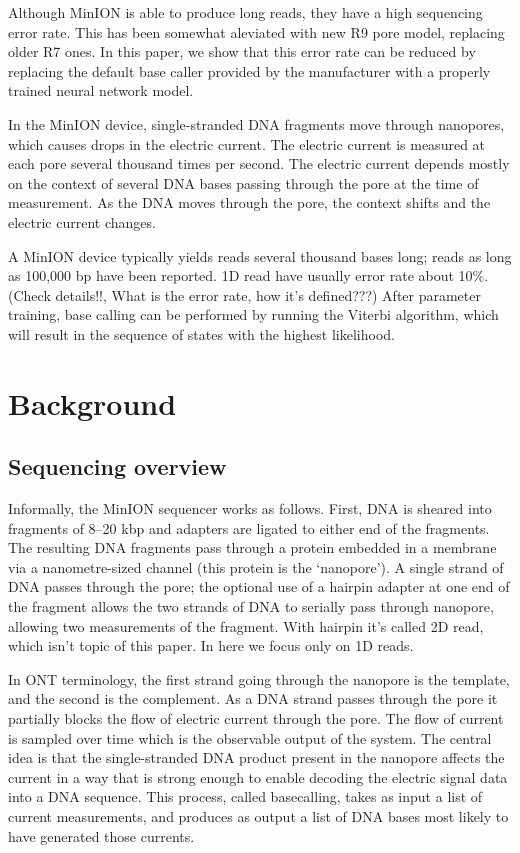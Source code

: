 \documentclass[times, utf8, seminar, numeric]{fer}
\begin{document}
Although MinION is able to produce long reads, they have a high sequencing error rate. This has been somewhat aleviated with new R9 pore model, replacing older R7 ones. In this paper, we show that this error rate can be reduced by replacing the default base caller provided by the manufacturer with a properly trained neural network model.

In the MinION device, single-stranded DNA fragments move through nanopores, which causes drops in the electric current. The electric current is measured at each pore several thousand times per second. The electric current depends mostly on the context of several DNA bases passing through the pore at the time of measurement. As the DNA moves through the pore, the context shifts and the electric current changes.

A MinION device typically yields reads several thousand bases long; reads as long as 100,000 bp have been reported. 1D read have usually error rate about   10\%. (Check details!!, What is the error rate, how it's defined???) After parameter training, base calling can be performed by running the Viterbi algorithm, which will result in the sequence of states with the highest likelihood.

\chapter{Background}

\section{Sequencing overview}
Informally, the MinION sequencer works as follows. First, DNA is sheared into fragments of 8–20 kbp and adapters are ligated to either end of the fragments. The resulting DNA fragments pass through a protein embedded in a membrane via a nanometre-sized channel (this protein is the `nanopore'). A single strand of DNA passes through the pore; the optional use of a hairpin adapter at one end of the fragment allows the two strands of DNA to serially pass through nanopore, allowing two measurements of the fragment. With hairpin it's called 2D read, which isn't topic of this paper. In here we focus only on 1D reads.

In ONT terminology, the first strand going through the nanopore is the template, and the second is the complement. As a DNA strand passes through the pore it partially blocks the flow of electric current through the pore. The flow of current is sampled over time which is the observable output of the system. The central idea is that the single-stranded DNA product present in the nanopore affects the current in a way that is strong enough to enable decoding the electric signal data into a DNA sequence. This process, called basecalling, takes as input a list of current measurements, and produces as output a list of DNA bases most likely to have generated those currents.
\end{document}
